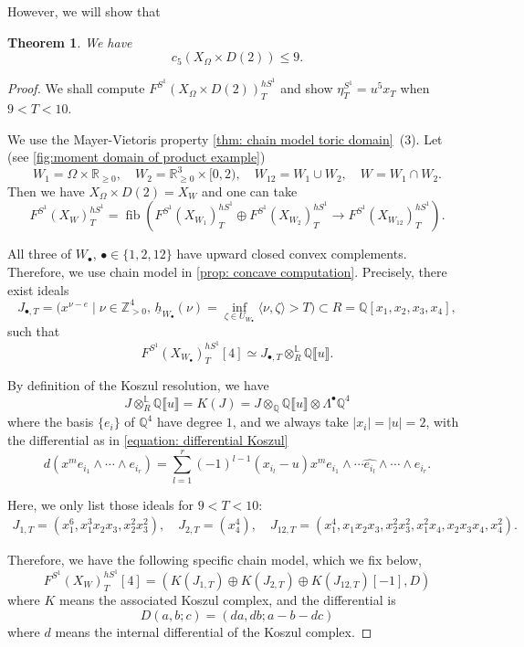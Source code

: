 \documentclass[11pt]{amsart}
\numberwithin{equation}{section}
\theoremstyle{plain}
\newtheorem{Thm}{Theorem}[section]
\theoremstyle{definition}
\theoremstyle{remark}
\newcommand{\bQ} { {\mathbb{Q}}}
\newcommand{\bZ} { {\mathbb{Z}}}
\newcommand{\bR} { {\mathbb{R}}}
\newcommand{\fpw}[1]{{\llbracket #1\rrbracket}}
\newcommand\fib{\operatorname{fib}}
\begin{document}
However, we will show that 
\begin{Thm}\label{prop: couterexample capacity estimation}We have
\[c_5(X_\Omega \times D(2))\leq 9.\]
  
\end{Thm}
\begin{proof}
    

We shall compute $F^{S^1}(X_\Omega \times D(2))_T^{hS^1}$ and show $\eta_T^{S^1}=u^5x_T$ when $9<T<10$.

We use the Mayer-Vietoris property \autoref{thm: chain model toric domain}~(3). Let (see \autoref{fig:moment domain of product example})
\[W_1=\Omega\times \bR_{\geq0},\quad W_2=\bR^3_{\geq0} \times [0,2),\quad W_{12}=W_1\cup W_2, \quad W=W_1\cap W_2.\]
Then we have $X_\Omega \times D(2)=X_W$ and one can take
\[F^{S^1}(X_W)_T^{hS^1}=\fib\left(F^{S^1}(X_{W_1}  )_T^{hS^1}\oplus  F^{S^1}(X_{W_2})_T^{hS^1}   \to F^{S^1}(X_{W_{12}})_T^{hS^1}\right).\]


All three of $W_\bullet$, $\bullet\in \{1,2,12\}$ have upward closed convex complements. Therefore, we use chain model in \autoref{prop: concave computation}. Precisely, there exist ideals 
\[J_{\bullet,T}=\big(x^{\nu-e}\mid \nu\in \bZ_{>0}^4, \, \underline{h}_{W_\bullet}(\nu)=\inf_{\zeta\in {U_{W_\bullet}}}\langle \nu,\zeta\rangle>T\big)\subset R=\bQ[x_1,x_2,x_3,x_4],\] 
such that 
\[F^{S^1}(X_{W_{\bullet}})_T^{hS^1}[4]\simeq J_{\bullet,T} \otimes_R^\mathbb{L} \bQ\fpw{u}.\]

By definition of the Koszul resolution, we have 
\[J \otimes_R^\mathbb{L} \bQ\fpw{u}= K(J)=J\otimes_\bQ\bQ\fpw{u}\otimes \Lambda^\bullet \bQ^4\]
where the basis $\{e_i\}$ of $\bQ^4$ have degree $1$, and we always take $|x_i|=|u|=2$, with the differential as in \autoref{equation: differential Koszul} 
\[d(x^m e_{i_1}\wedge\cdots \wedge e_{i_r})=\sum_{l=1}^{r }(-1)^{l-1}(x_{i_l}-u)x^m e_{i_1}\wedge\cdots \widehat{e_{i_l}}  \wedge \cdots\wedge e_{i_r} .\]





Here, we only list those ideals for $9<T<10$:
\begin{align*}
    J_{1,T}=(x_1^6,x_1^3x_2x_3,x_2^2x_3^2),\quad
    J_{2,T}=(x_4^4),\quad
    J_{12,T}=(x_1^4,x_1x_2x_3,x_2^2x_3^2,x_1^2x_4,x_2x_3x_4,x_4^2).
\end{align*}


Therefore, we have the following specific chain model, which we fix below,
\[F^{S^1}(X_W)_T^{hS^1}[4]=(K(J_{1,T})\oplus K(J_{2,T})\oplus K(J_{12,T})[-1], D)\]
where $K$ means the associated Koszul complex, and the differential is 
\[D(a,b;c)=(da,db;a-b-dc)\]
where $d$ means the internal differential of the Koszul complex.


\end{proof}
\end{document}
